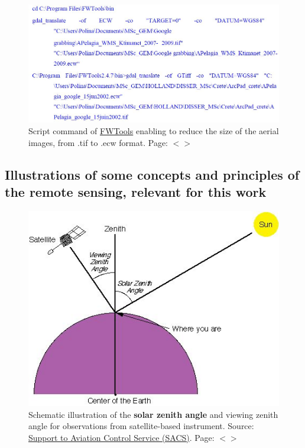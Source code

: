 \documentclass[11pt]{article}
\begin{document}
\begin{appendices}
\begin{figure}[H]
	\begin{center}
		\includegraphics[scale=0.4]{Script_Gdal.jpg}
		\caption{Script command of \href{http://fwtools.maptools.org/}{FWTools} enabling to reduce the size of the aerial images, from .tif to .ecw format. Page: $<$\pageref{gdal}$>$}\label{fig:A.2}
	\end{center}	
\end{figure}

\subsection{Illustrations of some concepts and principles of the remote sensing, relevant for this work}

\begin{figure}[H]
	\begin{center}
		\includegraphics[scale=0.65]{Zenith.jpg}
		\caption{Schematic illustration of the \textbf{solar zenith angle} and viewing zenith angle for observations from satellite-based instrument. Source: \href{http://sacs.aeronomie.be/}{Support to Aviation Control Service (SACS)}. Page: $<$\pageref{zenith}$>$}\label{fig:A.2-1}
	\end{center}
\end{figure}
\pagebreak


\end{appendices}
\end{document}
